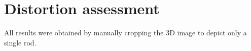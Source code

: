 
\section{Distortion assessment}
All results were obtained by manually cropping the 3D image to depict only a single rod.


